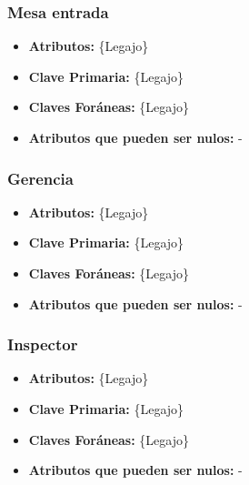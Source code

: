 \documentclass[a4paper,11pt]{article}
\begin{document}
\subsubsection{Mesa entrada}

\begin{itemize}

	\item \textbf{Atributos:} \{Legajo\}
	
	\item \textbf{Clave Primaria:} \{Legajo\}
	
	\item \textbf{Claves Foráneas:} \{Legajo\}
	
	\item \textbf{Atributos que pueden ser nulos:} -
	
\end{itemize}

\subsubsection{Gerencia}

\begin{itemize}

	\item \textbf{Atributos:} \{Legajo\}
	
	\item \textbf{Clave Primaria:} \{Legajo\}
	
	\item \textbf{Claves Foráneas:} \{Legajo\}
	
	\item \textbf{Atributos que pueden ser nulos:} -
	
\end{itemize}

\subsubsection{Inspector}

\begin{itemize}

	\item \textbf{Atributos:} \{Legajo\}
	
	\item \textbf{Clave Primaria:} \{Legajo\}
	
	\item \textbf{Claves Foráneas:} \{Legajo\}
	
	\item \textbf{Atributos que pueden ser nulos:} -
	
\end{itemize}
\end{document}
